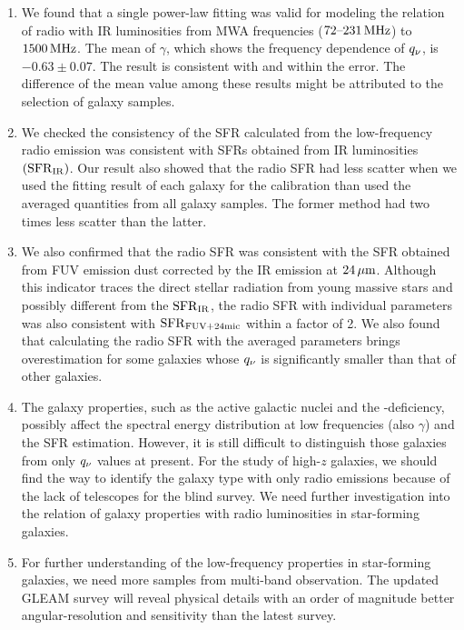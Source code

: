 \begin{enumerate}
    \item We found that a single power-law fitting was valid for modeling the relation of radio with IR luminosities from MWA frequencies ($72\mbox{--}231\,\mathrm{MHz}$) to $1500\,\mathrm{MHz}$.
        The mean of $\gamma$, which shows the frequency dependence of $q_{\nu}$, is $-0.63\pm0.07$.
        The result is consistent with \citet{CalistroRivera2017a} and \citet{Chyzy2018} within the error.
        The difference of the mean value among these results might be attributed to the selection of galaxy samples.
    \item We checked the consistency of the SFR calculated from the low-frequency radio emission was consistent with SFRs obtained from IR luminosities $\left(\mathrm{SFR}_{\mathrm{IR}}\right)$.
        Our result also showed that the radio SFR had less scatter when we used the fitting result of each galaxy for the calibration than used the averaged quantities from all galaxy samples.
        The former method had two times less scatter than the latter.
    \item We also confirmed that the radio SFR was consistent with the SFR obtained from FUV emission dust corrected by the IR emission at $24\,\mathrm{\mu m}$.
        Although this indicator traces the direct stellar radiation from young massive stars and possibly different from the $\mathrm{SFR}_{\mathrm{IR}}$, the radio SFR with individual parameters was also consistent with $\mathrm{SFR}_{\mathrm{FUV+24mic}}$ within a factor of 2.
        We also found that calculating the radio SFR with the averaged parameters brings overestimation for some galaxies whose $q_{\nu}$ is significantly smaller than that of other galaxies.
    \item The galaxy properties, such as the active galactic nuclei and the \nh-deficiency, possibly affect the spectral energy distribution at low frequencies (also $\gamma$) and the SFR estimation.
        However, it is still difficult to distinguish those galaxies from only $q_{\nu}$ values at present.
        For the study of high-$z$ galaxies, we should find the way to identify the galaxy type with only radio emissions because of the lack of telescopes for the blind survey.
        We need further investigation into the relation of galaxy properties with radio luminosities in star-forming galaxies.
    \item For further understanding of the low-frequency properties in star-forming galaxies, we need more samples from multi-band observation.
        The updated GLEAM survey will reveal physical details with an order of magnitude better angular-resolution and sensitivity than the latest survey.
\end{enumerate}


